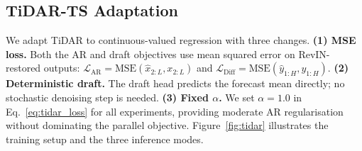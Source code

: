 \subsection{TiDAR-TS Adaptation}
\label{sec:tidar_adapt}

We adapt TiDAR \cite{tidar2024} to continuous-valued regression with three changes.
\textbf{(1) MSE loss.} Both the AR and draft objectives use mean squared error on RevIN-restored outputs:
$\mathcal{L}_{\mathrm{AR}} = \mathrm{MSE}(\hat{x}_{2:L}, x_{2:L})$ and $\mathcal{L}_{\mathrm{Diff}} = \mathrm{MSE}(\hat{y}_{1:H}, y_{1:H})$.
\textbf{(2) Deterministic draft.} The draft head predicts the forecast mean directly; no stochastic denoising step is needed.
\textbf{(3) Fixed $\alpha$.} We set $\alpha = 1.0$ in Eq.~\eqref{eq:tidar_loss} for all experiments, providing moderate AR regularisation without dominating the parallel objective.
Figure~\ref{fig:tidar} illustrates the training setup and the three inference modes.

